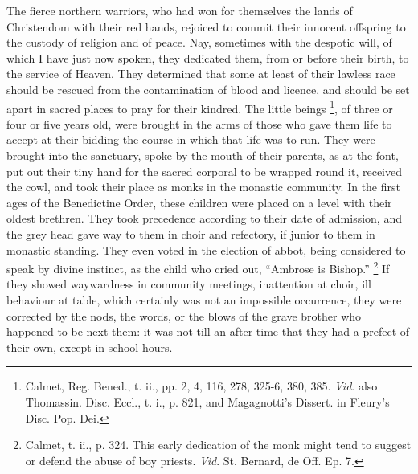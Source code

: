The fierce northern warriors, who had won for themselves the lands
of Christendom with their red hands, rejoiced to commit their innocent
offspring to the custody of religion and of peace. Nay, sometimes with
the despotic will, of which I have just now spoken, they dedicated
them, from or before their birth, to the service of Heaven. They
determined that some at least of their lawless race should be rescued
from the contamination of blood and licence, and should be set apart
in sacred places to pray for their kindred. The little beings \footnote{Calmet, Reg.
Bened., t. ii., pp. 2, 4, 116, 278, 325-6, 380, 385. \emph{Vid}. also
Thomassin. Disc. Eccl., t. i., p. 821, and Magagnotti's Dissert. in
Fleury's Disc. Pop. Dei.}, of three or four or five years old, were brought in the arms
of those who gave them life to accept at their bidding the course in
which that life was to run. They were brought into the sanctuary,
spoke by the mouth of their parents, as at the font, put out their
tiny hand for the sacred corporal to be wrapped round it, received the
cowl, and took their place as monks in the monastic community. In the
first ages of the Benedictine Order, these children were placed on a
level with their oldest brethren. They took precedence according to
their date of admission, and the grey head gave way to them in choir
and refectory, if junior to them in monastic standing. They even voted
in the election of abbot, being considered to speak by divine
instinct, as the child who cried out, ``Ambrose is Bishop.'' \footnote{Calmet, t.
ii., p. 324. This early dedication of the monk might tend to suggest
or defend the abuse of boy priests. \emph{Vid}. St. Bernard, de Off.
Ep. 7.} If they showed waywardness in community meetings, inattention
at choir, ill behaviour at table, which certainly was not an
impossible occurrence, they were corrected by the nods, the words, or
the blows of the grave brother who happened to be next them: it was
not till an after time that they had a prefect of their own, except in
school hours.


